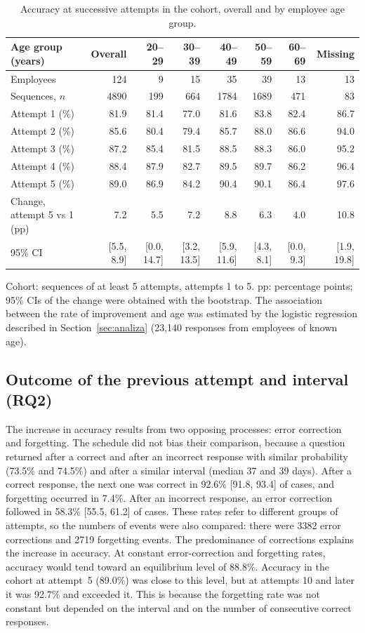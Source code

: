 \documentclass[preprint,12pt,authoryear]{elsarticle}
\newcommand{\uwagatabeli}[1]{\par\vspace{2pt}\parbox{\linewidth}{\footnotesize #1}}
\begin{document}
\begin{table}[H]
\centering
\caption{Accuracy at successive attempts in the cohort, overall and by employee age group.}
\label{tab:sekwencje_wiek}
\footnotesize
\setlength{\tabcolsep}{4pt}
\begin{tabular}{l*{7}{r}}
\toprule
Age group (years) & Overall & 20--29 & 30--39 & 40--49 & 50--59 & 60--69 & Missing \\
\midrule
Employees & 124 & 9 & 15 & 35 & 39 & 13 & 13 \\
Sequences, $n$ & 4890 & 199 & 664 & 1784 & 1689 & 471 & 83 \\
\midrule
Attempt 1 (\%) & 81.9 & 81.4 & 77.0 & 81.6 & 83.8 & 82.4 & 86.7 \\
Attempt 2 (\%) & 85.6 & 80.4 & 79.4 & 85.7 & 88.0 & 86.6 & 94.0 \\
Attempt 3 (\%) & 87.2 & 85.4 & 81.5 & 88.5 & 88.3 & 86.0 & 95.2 \\
Attempt 4 (\%) & 88.4 & 87.9 & 82.7 & 89.5 & 89.7 & 86.2 & 96.4 \\
Attempt 5 (\%) & 89.0 & 86.9 & 84.2 & 90.4 & 90.1 & 86.4 & 97.6 \\
\midrule
Change, attempt 5 vs 1 (pp) & 7.2 & 5.5 & 7.2 & 8.8 & 6.3 & 4.0 & 10.8 \\
95\% CI & [5.5, 8.9] & [0.0, 14.7] & [3.2, 13.5] & [5.9, 11.6] & [4.3, 8.1] & [0.0, 9.3] & [1.9, 19.8] \\
\bottomrule
\end{tabular}%
\uwagatabeli{Cohort: sequences of at least 5 attempts, attempts 1 to 5.
pp: percentage points; 95\% CIs of the change were obtained with the bootstrap. The association between
the rate of improvement and age was estimated by the logistic regression described in
Section~\ref{sec:analiza} (23{,}140 responses from employees of known age).}
\end{table}

\subsection{Outcome of the previous attempt and interval (RQ2)}
The increase in accuracy results from two opposing processes: error correction and forgetting. The
schedule did not bias their comparison, because a question returned after a correct and after an
incorrect response with similar probability (73.5\% and 74.5\%) and
after a similar interval (median 37 and 39 days). After a correct
response, the next one was correct in 92.6\% [91.8, 93.4] of cases, and forgetting occurred in
7.4\%. After an incorrect response, an error correction followed in 58.3\%
[55.5, 61.2] of cases. These rates refer to different groups of attempts, so the numbers of events were
also compared: there were 3382 error corrections and 2719 forgetting events. The
predominance of corrections explains the increase in accuracy. At constant error-correction and
forgetting rates, accuracy would tend toward an equilibrium level of 88.8\%. Accuracy in the
cohort at attempt~5 (89.0\%) was close to this level, but at attempts 10 and
later it was 92.7\% and exceeded it. This is because the forgetting rate was not constant but
depended on the interval and on the number of consecutive correct responses.
\end{document}
